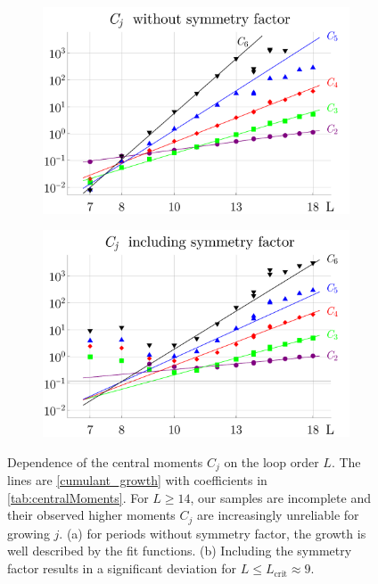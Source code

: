 \documentclass[12pt,a4paper]{article}
\renewcommand{\|}{\rule[-0.4ex]{0.2ex}{1.2em}}
\begin{document}
\begin{figure}[htb]
	\begin{subfigure}[b]{.48 \textwidth}
		\includegraphics[width=\linewidth]{Cj_without_symfactor}
		\subcaption{}
	\end{subfigure}
	\begin{subfigure}[b]{.48 \textwidth}
		\includegraphics[width=\linewidth]{Cj_with_symfactor}
		\subcaption{}
	\end{subfigure}
	
	\caption{Dependence of the central moments $C_j$ on the loop order $L$. The lines are  \cref{cumulant_growth} with coefficients in \cref{tab:centralMoments}. For $L\geq 14$, our samples are incomplete and their observed higher moments $C_j$ are increasingly unreliable for growing $j$. (a) for periods without symmetry factor, the growth is well described by the fit functions. (b) Including the symmetry factor results in a significant deviation for $L\leq L_\text{crit}\approx 9$.   }
	\label{fig:Cj_growth}
\end{figure}
\end{document}

